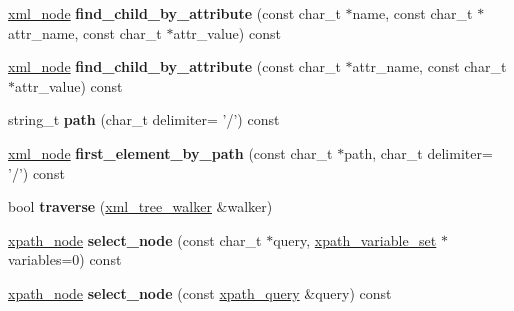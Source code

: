 \begin{DoxyCompactItemize}
\item 
\hypertarget{classpugi_1_1xml__node_adcbe6392a84e4d156cca69c8ec3224da}{\hyperlink{classpugi_1_1xml__node}{xml\+\_\+node} {\bfseries find\+\_\+child\+\_\+by\+\_\+attribute} (const char\+\_\+t $\ast$name, const char\+\_\+t $\ast$attr\+\_\+name, const char\+\_\+t $\ast$attr\+\_\+value) const }\label{classpugi_1_1xml__node_adcbe6392a84e4d156cca69c8ec3224da}

\item 
\hypertarget{classpugi_1_1xml__node_a96377b213e80a99cc21db911610b88e0}{\hyperlink{classpugi_1_1xml__node}{xml\+\_\+node} {\bfseries find\+\_\+child\+\_\+by\+\_\+attribute} (const char\+\_\+t $\ast$attr\+\_\+name, const char\+\_\+t $\ast$attr\+\_\+value) const }\label{classpugi_1_1xml__node_a96377b213e80a99cc21db911610b88e0}

\item 
\hypertarget{classpugi_1_1xml__node_ae5694be88058346ad8e6e418410d4979}{string\+\_\+t {\bfseries path} (char\+\_\+t delimiter= '/') const }\label{classpugi_1_1xml__node_ae5694be88058346ad8e6e418410d4979}

\item 
\hypertarget{classpugi_1_1xml__node_ae701cc3920f4a779610f94219bb41fe1}{\hyperlink{classpugi_1_1xml__node}{xml\+\_\+node} {\bfseries first\+\_\+element\+\_\+by\+\_\+path} (const char\+\_\+t $\ast$path, char\+\_\+t delimiter= '/') const }\label{classpugi_1_1xml__node_ae701cc3920f4a779610f94219bb41fe1}

\item 
\hypertarget{classpugi_1_1xml__node_a951d5d02987f75fabc4d575cfdeec8b4}{bool {\bfseries traverse} (\hyperlink{classpugi_1_1xml__tree__walker}{xml\+\_\+tree\+\_\+walker} \&walker)}\label{classpugi_1_1xml__node_a951d5d02987f75fabc4d575cfdeec8b4}

\item 
\hypertarget{classpugi_1_1xml__node_a87dc7d267f7aab02865c3f7a9705ad82}{\hyperlink{classpugi_1_1xpath__node}{xpath\+\_\+node} {\bfseries select\+\_\+node} (const char\+\_\+t $\ast$query, \hyperlink{classpugi_1_1xpath__variable__set}{xpath\+\_\+variable\+\_\+set} $\ast$variables=0) const }\label{classpugi_1_1xml__node_a87dc7d267f7aab02865c3f7a9705ad82}

\item 
\hypertarget{classpugi_1_1xml__node_ac1e3f0f7635461031ea1ee5b63a4993c}{\hyperlink{classpugi_1_1xpath__node}{xpath\+\_\+node} {\bfseries select\+\_\+node} (const \hyperlink{classpugi_1_1xpath__query}{xpath\+\_\+query} \&query) const }\label{classpugi_1_1xml__node_ac1e3f0f7635461031ea1ee5b63a4993c}


\end{DoxyCompactItemize}
